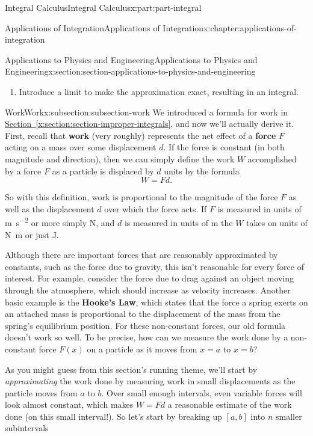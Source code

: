 \documentclass[twoside,10pt,]{book}
\newcommand{\xreffont}{\relax}
\newcommand{\terminology}[1]{\textbf{#1}}
\numberwithin{equation}{part}
\begin{document}
\begin{partptx}{Integral Calculus}{}{Integral Calculus}{}{}{x:part:part-integral}
\begin{chapterptx}{Applications of Integration}{}{Applications of Integration}{}{}{x:chapter:applications-of-integration}
\begin{sectionptx}{Applications to Physics and Engineering}{}{Applications to Physics and Engineering}{}{}{x:section:section-applications-to-physics-and-engineering}
\begin{introduction}{}
\begin{enumerate}
\item{}Introduce a limit to make the approximation exact, resulting in an integral.%
\end{enumerate}
\end{introduction}%
%
%
\typeout{************************************************}
\typeout{************************************************}
%
\begin{subsectionptx}{Work}{}{Work}{}{}{x:subsection:subsection-work}
We introduced a formula for work in \hyperref[x:section:section-improper-integrals]{Section~{\xreffont\ref{x:section:section-improper-integrals}}}, and now we'll actually derive it. First, recall that \terminology{work} (very roughly) represents the net effect of a \terminology{force} \(F\) acting on a mass over some displacement \(d\). If the force is constant (in both magnitude and direction), then we can simply define the work \(W\) accomplished by a force \(F\) as a particle is displaced by \(d\) units by the formula%
\begin{equation*}
W = Fd.
\end{equation*}
%
\par
So with this definition, work is proportional to the magnitude of the force \(F\) as well as the displacement \(d\) over which the force acts. If \(F\) is measured in units of \si{\meter\per\second\tothe{2}} or more simply \si{\newton}, and \(d\) is measured in units of \si{\meter} the \(W\) takes on units of \si{\newton\meter} or just \si{\joule}.%
\par
Although there are important forces that are reasonably approximated by constants, such as the force due to gravity, this isn't reasonable for every force of interest. For example, consider the force due to drag against an object moving through the atmosphere, which should increase as velocity increases. Another basic example is the \terminology{Hooke's Law}, which states that the force a spring exerts on an attached mass is proportional to the displacement of the mass from the spring's equilibrium position. For these non-constant forces, our old formula doesn't work so well. To be precise, how can we measure the work done by a non-constant force \(F(x)\) on a particle as it moves from \(x = a\) to \(x = b\)?%
\par
As you might guess from this section's running theme, we'll start by \emph{approximating} the work done by measuring work in small displacements as the particle moves from \(a\) to \(b\). Over small enough intervals, even variable forces will look almost constant, which makes \(W = Fd\) a reasonable estimate of the work done (on this small interval!). So let's start by breaking up \([a,b]\) into \(n\) smaller subintervals%

\end{subsectionptx}
\end{sectionptx}
\end{chapterptx}
\end{partptx}
\end{document}
